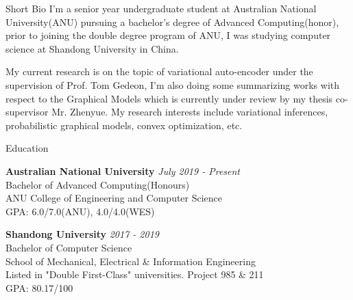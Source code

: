 \documentclass{resume} %
\begin{document}
\begin{rSection}{Short Bio}
I’m a senior year undergraduate student at Australian National University(ANU) pursuing a bachelor's degree of Advanced Computing(honor), prior to joining the double degree program of ANU, I was studying computer science at Shandong University in China.

My current research is on the topic of variational auto-encoder under the supervision of Prof. Tom Gedeon, I’m also doing some summarizing works with respect to the Graphical Models which is currently under review by my thesis co-supervisor Mr. Zhenyue. My research interests include variational inferences, probabilistic graphical models, convex optimization, etc.
\end{rSection}

\begin{rSection}{Education}

{\bf Australian National University} \hfill {\em July 2019 - Present} 
\\ Bachelor of Advanced Computing(Honours)
\\ ANU College of Engineering and Computer Science
\\ { GPA: 6.0/7.0(ANU), 4.0/4.0(WES) }
 
 {\bf Shandong University} \hfill {\em 2017 - 2019} 
\\ Bachelor of Computer Science
\\ School of Mechanical, Electrical \& Information Engineering
\\ Listed in "Double First-Class" universities. Project 985 \& 211
\\ { GPA: 80.17/100}


\end{rSection}
\end{document}
